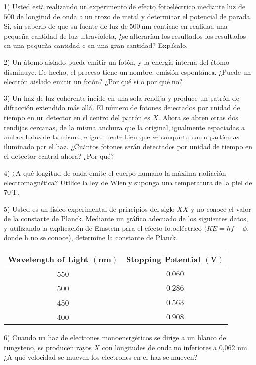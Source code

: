 





1) Usted está realizando un experimento de efecto fotoeléctrico mediante luz de $500$  de longitud de onda a un trozo de metal y determinar el potencial de parada. Si, sin saberlo de que su fuente de luz de $500 \mathrm{~nm}$ contiene en realidad una pequeña cantidad de luz ultravioleta, ¿̇se alterarían los resultados los resultados en una pequeña cantidad o en una gran cantidad? Explícalo.

2) Un átomo aislado puede emitir un fotón, y la energía interna del átomo disminuye. De hecho, el proceso tiene un nombre: emisión espontánea. ¿Puede un electrón aislado emitir un fotón? ¿Por qué sí o por qué no?

3) Un haz de luz coherente incide en una sola rendija y produce un patrón de difracción extendido más allá. El número de fotones detectados por unidad de tiempo en un detector en el centro del patrón es $X$. Ahora se abren otras dos rendijas cercanas, de la misma anchura que la original, igualmente espaciadas a ambos lados de la misma, e igualmente bien que se comporta como partículas iluminado por el haz. ¿Cuántos fotones serán detectados por unidad de tiempo en el detector central ahora? ¿Por qué?

4) ¿A qué longitud de onda emite el cuerpo humano la máxima radiación electromagnética? Utilice la ley de Wien y suponga una temperatura de la piel de $70^{\circ} \mathrm{F}$.

5) Usted es un físico experimental de principios del siglo $X X$ y no conoce el valor de la constante de Planck. Mediante un gráfico adecuado de los siguientes datos, y utilizando la explicación de Einstein para el efecto fotoeléctrico $(K E=h f-\phi$, donde h no se conoce), determine la constante de Planck.

\begin{tabular}{cc} 
Wavelength of Light $(\mathbf{n m})$ & Stopping Potential $(\mathbf{V})$ \\
\hline 550 & $0.060$ \\
\hline 500 & $0.286$ \\
\hline 450 & $0.563$ \\
\hline 400 & $0.908$ \\
\hline
\end{tabular}

6) Cuando un haz de electrones monoenergéticos se dirige a un blanco de tungsteno, se producen rayos $X$ con longitudes de onda no inferiores a 0,062 $\mathrm{nm}$. ¿A qué velocidad se mueven los electrones en el haz se mueven?

